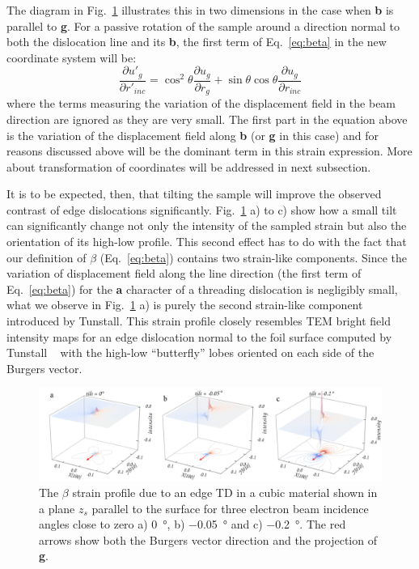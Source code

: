 The diagram in Fig.~\ref{fig:tilting_eff} illustrates this in two dimensions in the case when \textbf{b} is parallel to\textbf{ g}. For a passive rotation of the sample around a direction normal to both the dislocation line and its \textbf{b}, the first term of Eq.~\ref{eq:beta} in the new coordinate system will be:
\begin{equation*}
    \frac{\partial u'_g}{\partial r'_{inc}} = \cos^2{\theta}  \frac{\partial u_g}{\partial r_{g}} + \sin{\theta} \cos{\theta}  \frac{\partial u_g}{\partial r_{inc}}
\end{equation*}
where the terms measuring the variation of the displacement field in the beam direction are ignored as they are
very small. The first part in the equation above is the variation of the displacement field along \textbf{b} (or \textbf{g} in this case) and for reasons discussed above will be the dominant term in this strain expression. More about transformation of coordinates will be addressed in next subsection.



It is to be expected, then, that tilting the sample will improve the observed contrast of edge dislocations significantly. Fig.~\ref{fig:tilting_eff}  a) to c) show how a small tilt can significantly change not only the intensity of the sampled strain but also the orientation of its high-low profile. This second effect has to do with the fact that our definition of $\beta$ (Eq.~\ref{eq:beta}) contains two strain-like components. Since the variation of displacement field along the line direction  (the first term of Eq.~\ref{eq:beta}) for the \textbf{a} character of a threading dislocation is negligibly small, what we observe in Fig.~\ref{fig:tilting_eff} a) is purely the second strain-like component introduced by Tunstall. This strain profile closely resembles TEM bright field intensity maps for an edge dislocation normal to the foil surface computed by Tunstall \etal~\cite{Tunstall64}  with the high-low ``butterfly'' lobes oriented on each side of the Burgers vector.

\begin{figure}
    \centering
    \includegraphics[width=0.9\linewidth]{Figures/tilting_effect.png}
    \caption[Planar edge TD $\beta$ strain profile. ]{The $\beta$ strain profile due to an edge TD in a cubic material shown in a plane $z_s$ parallel to the surface for three electron beam incidence angles close to zero a) \SI{0}{\degree}, b) \SI{-0.05}{\degree} and c) \SI{-0.2}{\degree}. The red arrows show both the Burgers vector direction and the projection of \textbf{g}.}
    \label{fig:tilting_eff}
\end{figure}

